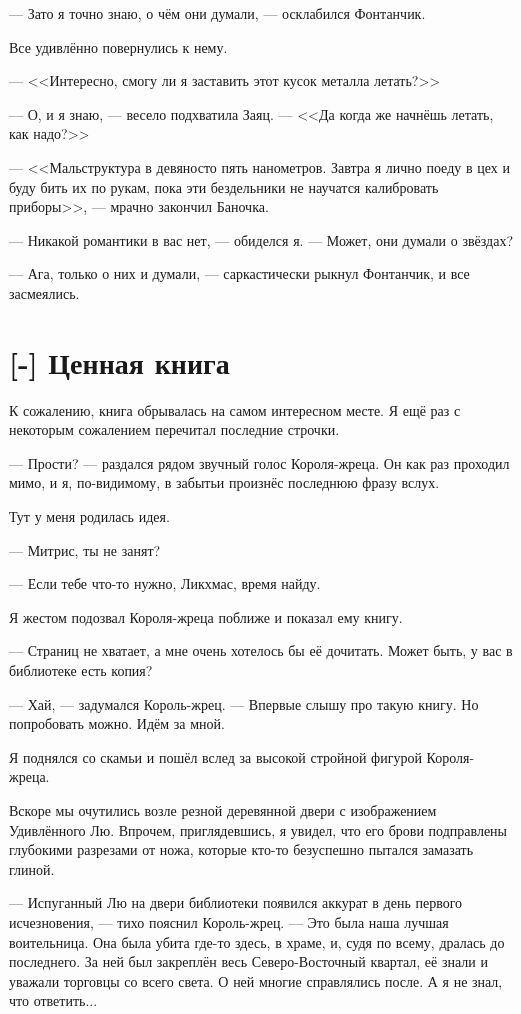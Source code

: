 --- Зато я точно знаю, о чём они думали, --- осклабился Фонтанчик.

Все удивлённо повернулись к нему.

--- <<Интересно, смогу ли я заставить этот кусок металла летать?>>

--- О, и я знаю, --- весело подхватила Заяц.
--- <<Да когда же начнёшь летать, как надо?>>

--- <<Мальструктура в девяносто пять нанометров.
Завтра я лично поеду в цех и буду бить их по рукам, пока эти бездельники не научатся калибровать приборы>>, --- мрачно закончил Баночка.

--- Никакой романтики в вас нет, --- обиделся я.
--- Может, они думали о звёздах?

--- Ага, только о них и думали, --- саркастически рыкнул Фонтанчик, и все засмеялись.

\section{[-] Ценная книга}

\textspace

К сожалению, книга обрывалась на самом интересном месте.
Я ещё раз с некоторым сожалением перечитал последние строчки.

--- Прости? --- раздался рядом звучный голос Короля-жреца.
Он как раз проходил мимо, и я, по-видимому, в забытьи произнёс последнюю фразу вслух.

Тут у меня родилась идея.

--- Митрис, ты не занят?

--- Если тебе что-то нужно, Ликхмас, время найду.

Я жестом подозвал Короля-жреца поближе и показал ему книгу.

--- Страниц не хватает, а мне очень хотелось бы её дочитать.
Может быть, у вас в библиотеке есть копия?

--- Хай, --- задумался Король-жрец.
--- Впервые слышу про такую книгу.
Но попробовать можно.
Идём за мной.

Я поднялся со скамьи и пошёл вслед за высокой стройной фигурой Короля-жреца.

Вскоре мы очутились возле резной деревянной двери с изображением Удивлённого Лю.
Впрочем, приглядевшись, я увидел, что его брови подправлены глубокими разрезами от ножа, которые кто-то безуспешно пытался замазать глиной.

--- Испуганный Лю на двери библиотеки появился аккурат в день первого исчезновения, --- тихо пояснил Король-жрец.
--- Это была наша лучшая воительница.
Она была убита где-то здесь, в храме, и, судя по всему, дралась до последнего.
За ней был закреплён весь Северо-Восточный квартал, её знали и уважали торговцы со всего света.
О ней многие справлялись после.
А я не знал, что ответить...

